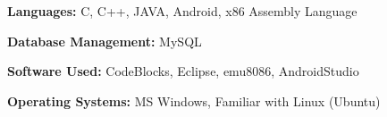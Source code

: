 \textbf{Languages: }
C, C++, JAVA, Android, x86 Assembly Language

\textbf{Database Management: }
MySQL

\textbf{Software Used: }
CodeBlocks, Eclipse, emu8086, AndroidStudio

\textbf{Operating Systems: }
MS Windows, Familiar with Linux (Ubuntu)